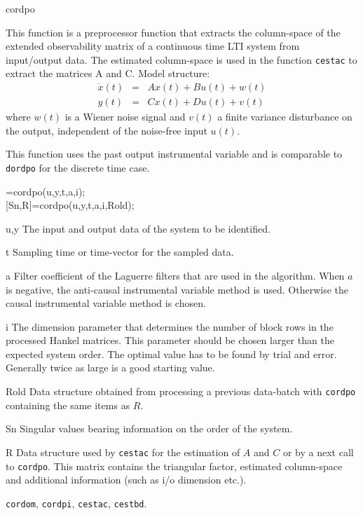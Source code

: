 \documentclass{book}
\newcommand{\dordpo}{\texttt{dordpo}}
\newcommand{\cordom}{\texttt{cordom}}
\newcommand{\cordpo}{\texttt{cordpo}}
\newcommand{\cordpi}{\texttt{cordpi}}
\newcommand{\cestac}{\texttt{cestac}}
\newcommand{\cestbd}{\texttt{cestbd}}
\begin{document}
\begin{command}{cordpo}
\begin{purpose}
    This function is a preprocessor function that extracts the
    column-space of the extended observability matrix of a continuous
    time LTI system from input/output data. The estimated column-space
    is used in the function {\cestac} to extract the matrices A and C.
  Model structure: 
  \begin{eqnarray*}
    \dot{x}(t) &=&  A x(t) + B u(t) +w(t)\\
    y(t) &=& C x(t) + Du(t) + v(t)
  \end{eqnarray*}
  where $w(t)$ is a Wiener noise signal and $v(t)$ a finite variance
  disturbance on the output, independent of the noise-free input
  $u(t)$.
  
  This function uses the past output instrumental variable and is comparable
  to {\dordpo} for the discrete time case.
\end{purpose}
  
\begin{syntax}
[Sn,R]=cordpo(u,y,t,a,i);\\[0pt]
[Sn,R]=cordpo(u,y,t,a,i,Rold);
\end{syntax}

\begin{inputs}
\item[u,y] The input and output data of the system to be identified.
\item[t] Sampling time or time-vector for the sampled data.
\item[a] Filter coefficient of the Laguerre filters that are used in
  the algorithm. When $a$ is negative, the anti-causal instrumental
  variable method is used. Otherwise the causal instrumental
  variable method is chosen.
\item[i] The dimension parameter that determines the number of block
  rows in the processed Hankel matrices. This parameter should be
  chosen larger than the expected system order. The optimal value
  has to be found by trial and error. Generally twice as large is a
  good starting value.
\item[Rold] Data structure obtained from processing a previous
  data-batch with {\cordpo} containing the same items as $R$.
\end{inputs}

\begin{outputs}
\item[Sn] Singular values bearing information on the order of the
  system.
\item[R] Data structure used by {\cestac} for the estimation of $A$
  and $C$ or by a next call to {\cordpo}. This matrix contains the
  triangular factor, estimated column-space and additional information
  (such as i/o dimension etc.).
\end{outputs}
         
\begin{seealso}
{\cordom}, {\cordpi}, {\cestac}, {\cestbd}.
\end{seealso}
\end{command}%
\end{document}
